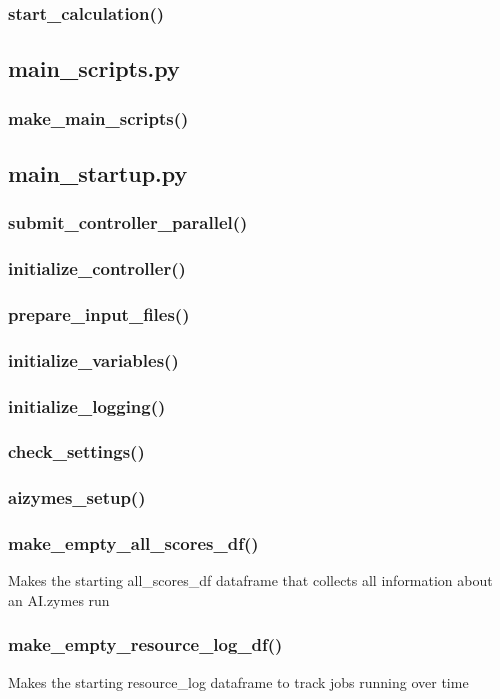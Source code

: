 \documentclass[10pt]{extarticle}
\begin{document}
\subsubsection{start\_calculation()}
\subsection{main\_scripts.py}
\subsubsection{make\_main\_scripts()}
\subsection{main\_startup.py}
\subsubsection{submit\_controller\_parallel()}
\subsubsection{initialize\_controller()}
\subsubsection{prepare\_input\_files()}
\subsubsection{initialize\_variables()}
\subsubsection{initialize\_logging()}
\subsubsection{check\_settings()}
\subsubsection{aizymes\_setup()}
\subsubsection{make\_empty\_all\_scores\_df()}
Makes the starting all\_scores\_df dataframe that collects all information about an AI.zymes run
\subsubsection{make\_empty\_resource\_log\_df()}
Makes the starting resource\_log dataframe to track jobs running over time
\end{document}
